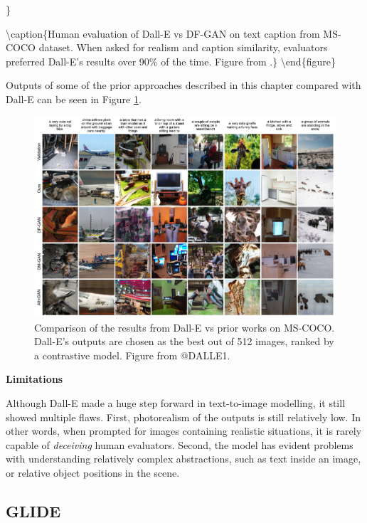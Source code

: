 \documentclass[
]{krantz}
\begin{document}
\}

\textbackslash caption\{Human evaluation of Dall-E vs DF-GAN on text caption from MS-COCO dataset. When asked for realism and caption similarity, evaluators preferred Dall-E's results over 90\% of the time. Figure from \citet{DALLE1}.\}\label{fig:dallephotorealism}
\textbackslash end\{figure\}

Outputs of some of the prior approaches described in this chapter compared with Dall-E can be seen in Figure \ref{fig:dalleexamples}.

\begin{figure}

{\centering \includegraphics[width=1\linewidth]{figures/02-02-text-2-img/dalleexamples} 

}

\caption{Comparison of the results from Dall-E vs prior works on MS-COCO. Dall-E's outputs are chosen as the best out of 512 images, ranked by a contrastive model. Figure from @DALLE1.}\label{fig:dalleexamples}
\end{figure}

\textbf{Limitations}

Although Dall-E made a huge step forward in text-to-image modelling, it still showed multiple flaws. First, photorealism of the outputs is still relatively low. In other words, when prompted for images containing realistic situations, it is rarely capable of \emph{deceiving} human evaluators. Second, the model has evident problems with understanding relatively complex abstractions, such as text inside an image, or relative object positions in the scene.

\hypertarget{glide}{%
\subsection{GLIDE}\label{glide}}
\end{document}
